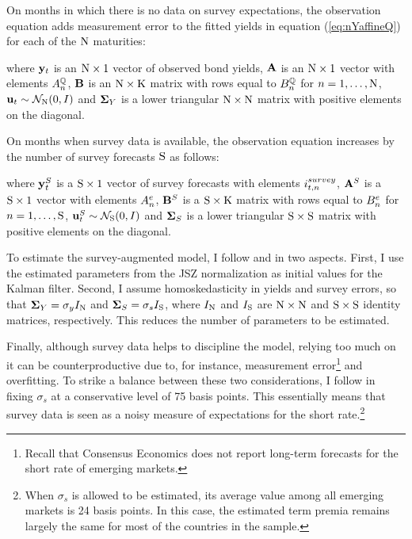 {On months in which there is no data on survey expectations, the observation equation adds measurement error to the fitted yields in equation (\ref{eq:nYaffineQ}) for each of the \(\mathrm{N}\) maturities:
	
\noindent where \(\mathbf{y}_{t}\) is an \(\mathrm{N} \times 1\) vector of observed bond yields, \(\mathbf{A}\) is an \(\mathrm{N} \times 1\) vector with elements \(A_{n}^{\mathbb{Q}}\), \(\mathbf{B}\) is an \(\mathrm{N} \times \mathrm{K}\) matrix with rows equal to \(B_{n}^{\mathbb{Q}}\) for \(n = 1, \ldots, \mathrm{N}\), \(\mathbf{u}_{t} \sim \mathcal{N}_{\mathrm{N}} (0,I) \) and \(\mathbf{\mathbf{\Sigma}}_{Y}\) is a lower triangular \(\mathrm{N} \times \mathrm{N}\) matrix with positive elements on the diagonal.

On months when survey data is available, the observation equation increases by the number of survey forecasts \(\mathrm{S}\) as follows:
	
\noindent where \(\mathbf{y}_{t}^{S}\) is a \(\mathrm{S} \times 1\) vector of survey forecasts with elements \(i_{t,n}^{survey}\), \(\mathbf{A}^{S}\) is a \(\mathrm{S} \times 1\) vector with elements \(A_{n}^{e}\), \(\mathbf{B}^{S}\) is a \(\mathrm{S} \times \mathrm{K}\) matrix with rows equal to \(B_{n}^{e}\) for \(n = 1, \ldots, \mathrm{S}\), \(\mathbf{u}_{t}^{S} \sim \mathcal{N}_{\mathrm{S}} (0,I) \) and \(\mathbf{\mathbf{\Sigma}}_{S}\) is a lower triangular \(\mathrm{S} \times \mathrm{S}\) matrix with positive elements on the diagonal.

To estimate the survey-augmented model, I follow \cite{Guimaraes:2014} and \cite{Lloyd:2018b} in two aspects. First, I use the estimated parameters from the JSZ normalization as initial values for the Kalman filter.
Second, I assume homoskedasticity in yields and survey errors, so that \(\mathbf{\mathbf{\Sigma}}_{Y} = \sigma_y I_{\mathrm{N}}\) and \(\mathbf{\mathbf{\Sigma}}_{S} = \sigma_s I_{\mathrm{S}}\), where \(I_{\mathrm{N}}\) and \(I_{\mathrm{S}}\) are \(\mathrm{N} \times \mathrm{N}\) and \(\mathrm{S} \times \mathrm{S}\) identity matrices, respectively.
This reduces the number of parameters to be estimated.

Finally, although survey data helps to discipline the model, relying too much on it can be counterproductive due to, for instance, measurement error\footnote{ Recall that Consensus Economics does not report long-term forecasts for the short rate of emerging markets.} and overfitting. 
To strike a balance between these two considerations, I follow \cite{KimOrphanides:2012} in fixing \(\sigma_s\) at a conservative level of 75 basis points. This essentially means that survey data is seen as a noisy measure of expectations for the short rate.\footnote{ When \(\sigma_s\) is allowed to be estimated, its average value among all emerging markets is 24 basis points. In this case, the estimated term premia remains largely the same for most of the countries in the sample.}

}
